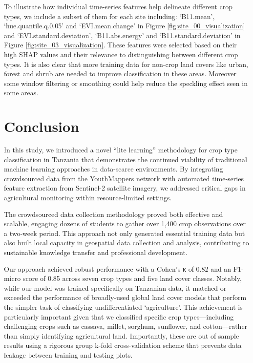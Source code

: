 \documentclass[
  journal,
  twocolumn]{IEEEtran}
\begin{document}
To illustrate how individual time-series features help delineate
different crop types, we include a subset of them for each site
including: `B11.mean', `hue.quantile.q.0.05' and `EVI.mean.change' in
Figure \ref{fig:site_00_visualization} and `EVI.standard.deviation',
`B11.abs.energy' and `B11.standard.deviation' in Figure
\ref{fig:site_03_visualization}. These features were selected based on
their high SHAP values and their relevance to distinguishing between
different crop types. It is also clear that more training data for
non-crop land covers like urban, forest and shrub are needed to improve
classification in these areas. Moreover some window filtering or
smoothing could help reduce the speckling effect seen in some areas.

\hypertarget{conclusion}{%
\section{Conclusion}\label{conclusion}}

In this study, we introduced a novel ``lite learning'' methodology for
crop type classification in Tanzania that demonstrates the continued
viability of traditional machine learning approaches in data-scarce
environments. By integrating crowdsourced data from the YouthMappers
network with automated time-series feature extraction from Sentinel-2
satellite imagery, we addressed critical gaps in agricultural monitoring
within resource-limited settings.

The crowdsourced data collection methodology proved both effective and
scalable, engaging dozens of students to gather over 1,400 crop
observations over a two-week period. This approach not only generated
essential training data but also built local capacity in geospatial data
collection and analysis, contributing to sustainable knowledge transfer
and professional development.

Our approach achieved robust performance with a Cohen's κ of 0.82 and an
F1-micro score of 0.85 across seven crop types and five land cover
classes. Notably, while our model was trained specifically on Tanzanian
data, it matched or exceeded the performance of broadly-used global land
cover models that perform the simpler task of classifying
undifferentiated `agriculture'. This achievement is particularly
important given that we classified specific crop types---including
challenging crops such as cassava, millet, sorghum, sunflower, and
cotton---rather than simply identifying agricultural land. Importantly,
these are out of sample results using a rigorous group k-fold
cross-validation scheme that prevents data leakage between training and
testing plots.
\end{document}
